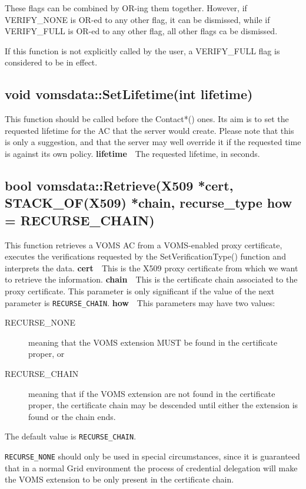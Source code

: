 \documentclass[a4paper]{book}
\newcommand{\parameter}[2]{\newline\textbf{#1}\ \ #2}
\begin{document}
These flags can be combined by OR-ing them together.  However, if
VERIFY\_NONE is OR-ed to any other flag, it can be dismissed, while if
VERIFY\_FULL is OR-ed to any other flag, all other flags ca be
dismissed.

If this function is not explicitly called by the user, a VERIFY\_FULL
flag is considered to be in effect.


\subsection{void vomsdata::SetLifetime(int lifetime)}

This function should be called before the Contact*() ones.  Its aim is
to set the requested lifetime for the AC that the server would
create.  Please note that this is only a suggestion, and that the
server may well override it if the requested time is against its own
policy.
\parameter{lifetime}{The requested lifetime, in seconds.}

\subsection{bool vomsdata::Retrieve(X509 *cert, STACK\_OF(X509) *chain, recurse\_type how = RECURSE\_CHAIN)}\label{ret}

This function retrieves a VOMS AC from a VOMS-enabled proxy
certificate, executes the verifications requested by the
SetVerificationType() function and interprets the data.
\parameter{cert}{This is the X509 proxy certificate from which we want to
retrieve the information.}
\parameter{chain}{This is the certificate chain associated to the proxy
certificate.  This parameter is only significant if the value of the
next parameter is \texttt{RECURSE\_CHAIN}.}
\parameter{how}{This parameters may have two values:
\begin{description}
\item[RECURSE\_NONE] meaning that the VOMS extension MUST be found in
  the certificate proper, or
\item[RECURSE\_CHAIN] meaning that if the VOMS extension are not found
  in the certificate proper, the certificate chain may be descended
  until either the extension is found or the chain ends.
\end{description}
The default value is \texttt{RECURSE\_CHAIN}.}

\texttt{RECURSE\_NONE} should only be used in special circumstances,
since it is guaranteed that in a normal Grid environment the process
of credential delegation will make the VOMS extension to be only
present in the certificate chain.
\end{document}
